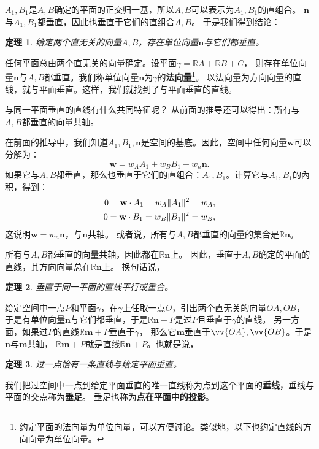 \documentclass[12pt,UTF8]{ctexbook}
\newtheorem{tm}{定理}[section]
\begin{document}
$A_1,B_1$是$A,B$确定的平面的正交归一基，所以$A,B$可以表示为$A_1,B_1$的直组合。
$\mathbf{n}$与$A_1,B_1$都垂直，因此也垂直于它们的直组合$A,B$。
于是我们得到结论：
\begin{tm}\label{tm:1-3-30}
    给定两个直无关的向量$A,B$，存在单位向量$\mathbf{n}$与它们都垂直。
\end{tm}
任何平面总由两个直无关的向量确定。设平面$\gamma = \mathbb{R}A + \mathbb{R}B + C$，
则存在单位向量$\mathbf{n}$与$A,B$都垂直。我们称单位向量$\mathbf{n}$为$\gamma$的\textbf{法向量}\footnote{约定平面的法向量为单位向量，可以方便讨论。类似地，以下也约定直线的方向向量为单位向量。}。
以法向量为方向向量的直线，就与平面垂直。这样，我们就找到了与平面垂直的直线。

与同一平面垂直的直线有什么共同特征呢？
从前面的推导还可以得出：所有与$A,B$都垂直的向量共轴。

在前面的推导中，我们知道$A_1,B_1,\mathbf{n}$是空间的基底。因此，空间中任何向量$\mathbf{w}$可以分解为：
$$ \mathbf{w} = w_A A_1 + w_B B_1 + w_n \mathbf{n}. $$
如果它与$A,B$都垂直，那么也垂直于它们的直组合：$A_1,B_1$。计算它与$A_1,B_1$的內积，得到：
\begin{align}
    0 = \mathbf{w}\cdot A_1  = w_A\|A_1\|^2 = w_A, \notag \\
    0 = \mathbf{w}\cdot B_1  = w_B\|B_1\|^2 = w_B, \notag 
\end{align}
这说明$\mathbf{w} = w_n \mathbf{n}$，与$\mathbf{n}$共轴。
或者说，所有与$A,B$都垂直的向量的集合是$\mathbb{R}\mathbf{n}$。

所有与$A,B$都垂直的向量共轴，因此都在$\mathbb{R}\mathbf{n}$上。
因此，垂直于$A,B$确定的平面的直线，其方向向量总在$\mathbb{R}\mathbf{n}$上。
换句话说，
\begin{tm}\label{tm:1-3-40}
    垂直于同一平面的直线平行或重合。
\end{tm}
给定空间中一点$P$和平面$\gamma$，在$\gamma$上任取一点$O$，引出两个直无关的向量$OA,OB$，
于是有单位向量$\mathbf{n}$与它们都垂直，于是$\mathbb{R}\mathbf{n} + P$是过$P$且垂直于$\gamma$的直线。
另一方面，如果过$P$的直线$\mathbb{R}\mathbf{m} + P$垂直于$\gamma$，
那么它$\mathbf{m}$垂直于$\vv{OA},\vv{OB}$。于是$\mathbf{n}$与$\mathbf{m}$共轴，
$\mathbb{R}\mathbf{m} + P$就是直线$\mathbb{R}\mathbf{n} + P$。也就是说，
\begin{tm}\label{tm:1-3-50}
    过一点恰有一条直线与给定平面垂直。
\end{tm}
我们把过空间中一点到给定平面垂直的唯一直线称为点到这个平面的\textbf{垂线}，垂线与平面的交点称为\textbf{垂足}。
垂足也称为\textbf{点在平面中的投影}。
\end{document}
